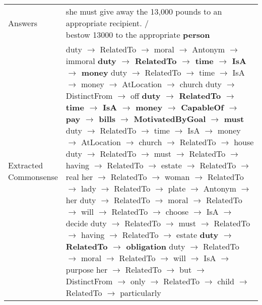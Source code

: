 \documentclass[11pt,a4paper]{article}
\begin{document}
\begin{table*}[!h]
\begin{small}
\begin{tabular}{|p{}|p{}|}
     Answers    & \makecell[l]{she must give away the 13,000 pounds to an appropriate recipient. /  \\ bestow 13000 to the appropriate \textbf{person}} \\
    \makecell[l]{Extracted \\ Commonsense} & \makecell[l]{\\
duty $\rightarrow$ RelatedTo $\rightarrow$ moral $\rightarrow$ Antonym $\rightarrow$ immoral\\
\textbf{duty $\rightarrow$ RelatedTo $\rightarrow$ time $\rightarrow$ IsA $\rightarrow$ money}\\
duty $\rightarrow$ RelatedTo $\rightarrow$ time $\rightarrow$ IsA $\rightarrow$ money $\rightarrow$ AtLocation $\rightarrow$ church\\
duty $\rightarrow$ DistinctFrom $\rightarrow$ off\\
\textbf{duty $\rightarrow$ RelatedTo $\rightarrow$ time $\rightarrow$ IsA $\rightarrow$ money $\rightarrow$ CapableOf $\rightarrow$ pay $\rightarrow$ bills} \textbf{$\rightarrow$ MotivatedByGoal} \\ \textbf{$\rightarrow$ must}\\
duty $\rightarrow$ RelatedTo $\rightarrow$ time $\rightarrow$ IsA $\rightarrow$ money $\rightarrow$ AtLocation $\rightarrow$ church $\rightarrow$ RelatedTo $\rightarrow$ house\\
duty $\rightarrow$ RelatedTo $\rightarrow$ must $\rightarrow$ RelatedTo $\rightarrow$ having $\rightarrow$ RelatedTo $\rightarrow$ estate $\rightarrow$ RelatedTo $\rightarrow$ real\\
her $\rightarrow$ RelatedTo $\rightarrow$ woman $\rightarrow$ RelatedTo $\rightarrow$ lady $\rightarrow$ RelatedTo $\rightarrow$ plate $\rightarrow$ Antonym $\rightarrow$ her\\
duty $\rightarrow$ RelatedTo $\rightarrow$ moral $\rightarrow$ RelatedTo $\rightarrow$ will $\rightarrow$ RelatedTo $\rightarrow$ choose $\rightarrow$ IsA $\rightarrow$ decide\\
duty $\rightarrow$ RelatedTo $\rightarrow$ must $\rightarrow$ RelatedTo $\rightarrow$ having $\rightarrow$ RelatedTo $\rightarrow$ estate\\
\textbf{duty $\rightarrow$ RelatedTo $\rightarrow$ obligation }\\
duty $\rightarrow$ RelatedTo $\rightarrow$ moral $\rightarrow$ RelatedTo $\rightarrow$ will $\rightarrow$ IsA $\rightarrow$ purpose\\
her $\rightarrow$ RelatedTo $\rightarrow$ but $\rightarrow$ DistinctFrom $\rightarrow$ only $\rightarrow$ RelatedTo $\rightarrow$ child $\rightarrow$ RelatedTo $\rightarrow$ particularly\\
}
\end{tabular}
\end{small}
\end{table*}
\end{document}
